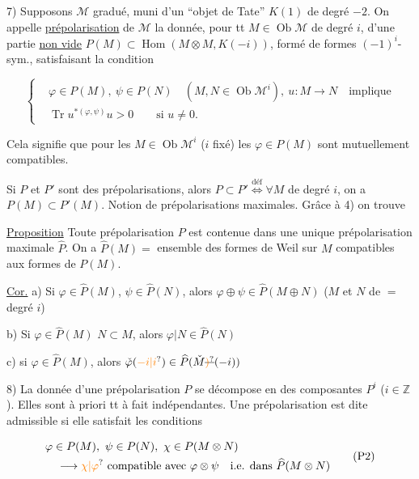 7)  Supposons $\mathcal M$ gradué, muni d'un ``objet de Tate'' $K(1)$ de degré $-2$. On appelle \uline{prépolarisation}  de $\mathcal M$ la donnée,  pour tt $M\in\operatorname{Ob}\mathcal M$ de degré $i$, d'une partie \uline{non vide}  $P(M)\subset\operatorname{Hom}(M\otimes M,K(-i))$, formé de formes $(-1)^i$-sym.,  satisfaisant la condition

\[
\left\{\begin{aligned}
&\varphi\in P(M),\ \psi\in P(N)\quad(M,N\in\operatorname{Ob}\mathcal M^i),\ u:M\to N\quad\text{implique}\\
&\operatorname{Tr}u^{*(\varphi,\psi)}u>0\qquad\text{si }u\ne0.
\end{aligned}\right. \tag*{(P1)}
\]

Cela signifie que pour les $M\in\operatorname{Ob}\mathcal M^i$ ($i$ fixé) les $\varphi\in P(M)$ sont mutuellement compatibles.


Si $P$ et $P'$ sont des prépolarisations, alors $P\subset P'\overset{\text{déf}}{\Longleftrightarrow}\forall M$ de degré $i$, on a $P(M)\subset P'(M)$. Notion de prépolarisations maximales. Grâce à 4) on trouve

\uline{Proposition} Toute prépolarisation $P$ est contenue dans une unique prépolarisation maximale $\widehat P$. On a $\widehat P(M)=$ ensemble des formes de Weil sur $M$ compatibles aux formes de $P(M)$.

\uline{Cor.} a) Si $\varphi\in\widehat P(M)$, $\psi\in\widehat P(N)$, alors $\varphi\oplus\psi\in\widehat P(M\oplus N)$ ($M$ et $N$ de $=$ degré $i$)

b) Si $\varphi\in\widehat P(M)$  $N\subset M$, alors $\varphi|N\in\widehat P(N)$

c) si $\varphi\in\widehat P(M)$, alors $\check\varphi(\unsure{-i|i})\in\widehat P(\check M\deleted{\unsure{)}}(-i))$


8)  La donnée d'une prépolarisation $P$ se décompose en des composantes $P^i$ ($i\in\mathbb Z$). Elles sont à priori tt à fait indépendantes. Une prépolarisation est dite admissible si elle satisfait les conditions

\[
\begin{aligned}
&\varphi\in P(M),\ \psi\in P(N),\ \chi\in P(M\otimes N)\\
&\quad\longrightarrow\unsure{\chi|\varphi}\ \text{compatible avec }\varphi\otimes\psi\quad\text{i.e. dans }\widehat P(M\otimes N)
\end{aligned}\tag*{(P2)}
\]

